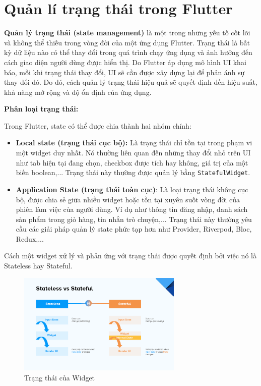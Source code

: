 \documentclass[../DoAn.tex]{subfiles}
\numberwithin{figure}{chapter}
\begin{document}
\section{Quản lí trạng thái trong Flutter}
\textbf{Quản lý trạng thái (state management)} là một trong những yếu tố cốt lõi và không thể thiếu trong vòng đời của một ứng dụng Flutter. Trạng thái là bất kỳ dữ liệu nào có thể thay đổi trong quá trình chạy ứng dụng và ảnh hưởng đến cách giao diện người dùng được hiển thị. Do Flutter áp dụng mô hình UI khai báo, mỗi khi trạng thái thay đổi, UI sẽ cần được xây dựng lại để phản ánh sự thay đổi đó. Do đó, cách quản lý trạng thái hiệu quả sẽ quyết định đến hiệu suất, khả năng mở rộng và độ ổn định của ứng dụng.

\textbf{Phân loại trạng thái:}

Trong Flutter, state có thể được chia thành hai nhóm chính:
\begin{itemize}
\item \textbf{Local state (trạng thái cục bộ): } Là trạng thái chỉ tồn tại trong phạm vi một widget duy nhất. Nó thường liên quan đến những thay đổi nhỏ trên UI như tab hiện tại đang chọn, checkbox được tích hay không, giá trị của một biến boolean,... Trạng thái này thường được quản lý bằng \texttt{StatefulWidget}.
\item \textbf{Application State (trạng thái toàn cục)}: Là loại trạng thái không cục bộ, được chia sẻ giữa nhiều widget hoặc tồn tại xuyên suốt vòng đời của phiên làm việc của người dùng. Ví dụ như thông tin đăng nhập, danh sách sản phẩm trong giỏ hàng, tin nhắn trò chuyện,... Trạng thái này thường yêu cầu các giải pháp quản lý state phức tạp hơn như Provider, Riverpod, Bloc, Redux,...
\end{itemize}

Cách một widget xử lý và phản ứng với trạng thái được quyết định bởi việc nó là Stateless hay Stateful.
\begin{figure}[H]
    \centering
    \includegraphics[width=0.7\textwidth]{Hinhve/Chuong5/stlessvastful.png}
    \caption{Trạng thái của Widget}
    \label{fig:stlessvastful}
\end{figure}
\end{document}
